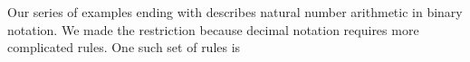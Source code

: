 \begin{remark}\label{rem:decimal_notation_grammar}
  Our series of examples ending with  describes natural number arithmetic in binary notation. We made the restriction because decimal notation requires more complicated rules. One such set of rules is
  \begin{bnf*}
      { \bnfor {} \bnfor \cdots \bnfor {}} \\
              { \bnfor {}} \\
       { \bnfor {} \bnfsp {}} \\
     { \bnfor {} \bnfsp {}}
  \end{bnf*}
\end{remark}
